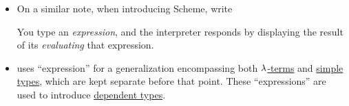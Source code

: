 \begin{comments}
\begin{itemize}
    \item On a similar note, when introducing Scheme,  write
    \begin{displayquote}
      You type an \textit{expression}, and the interpreter responds by displaying the result of its \textit{evaluating} that expression.
    \end{displayquote}

    \item {} uses \enquote{expression} for a generalization encompassing both \hyperref[def:lambda_term]{\( {\mathrm \lambda} \)-terms} and \hyperref[def:simple_type]{simple types}, which are kept separate before that point. These \enquote{expressions} are used to introduce \hyperref[con:dependent_type]{dependent types}.
  \end{itemize}
\end{comments}

